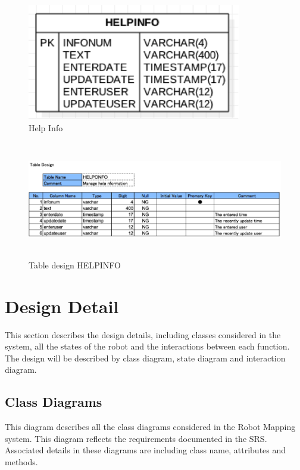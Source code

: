 \documentclass[11pt, a4paper]{article}
\begin{document}
\begin{figure}[H]
\centering
\includegraphics[height=2in]{HI}
\caption[Help Info]{Help Info}
\end{figure}

\begin{figure}[H]
\centering
\includegraphics[height=2in]{HE}
\caption[Table design HELPINFO ]{Table design HELPINFO }
\end{figure}
\newpage

\section{Design Detail}
This section describes the design details, including classes considered in the system, all the states of the robot and the interactions between each function. The design will be described by class diagram, state diagram and interaction diagram.

\subsection{Class Diagrams}
This diagram describes all the class diagrams considered in the Robot Mapping system. This diagram reflects the requirements documented in the SRS. Associated details in these diagrams are including class name, attributes and methods.\\
\end{document}
